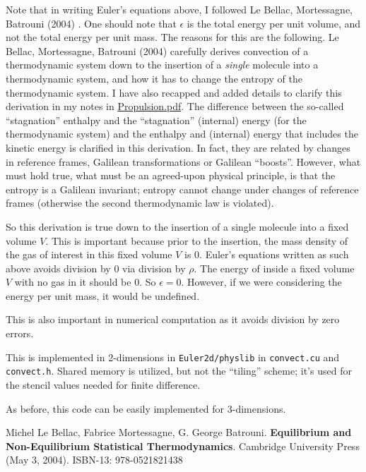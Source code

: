 \documentclass[10pt]{amsart}
\begin{document}
Note that in writing Euler's equations above, I followed Le Bellac, Mortessagne, Batrouni (2004) \cite{MLeBellacFMortessagneGBatrouni2004}.  One should note that $\epsilon$ is the total energy per unit volume, and not the total energy per unit mass.  The reasons for this are the following.  Le Bellac, Mortessagne, Batrouni (2004) \cite{MLeBellacFMortessagneGBatrouni2004} carefully derives convection of a thermodynamic system down to the insertion of a \emph{single} molecule into a thermodynamic system, and how it has to change the entropy of the thermodynamic system.  I have also recapped and added details to clarify this derivation in my notes in \href{https://github.com/ernestyalumni/Propulsion/blob/master/LaTeXandpdfs/Propulsion.pdf}{Propulsion.pdf}.  The difference between the so-called ``stagnation'' enthalpy and the ``stagnation'' (internal) energy (for the thermodynamic system) and the enthalpy and (internal) energy that includes the kinetic energy is clarified in this derivation.  In fact, they are related by changes in reference frames, Galilean transformations or Galilean ``boosts''.  However, what must hold true, what must be an agreed-upon physical principle, is that the entropy is a Galilean invariant; entropy cannot change under changes of reference frames (otherwise the second thermodynamic law is violated).

So this derivation is true down to the insertion of a single molecule into a fixed volume $V$.  This is important because prior to the insertion, the mass density of the gas of interest in this fixed volume $V$ is $0$.  Euler's equations written as such above avoids division by $0$ via division by $\rho$.  The energy of inside a fixed volume $V$ with no gas in it should be $0$.  So $\epsilon =0$.  However, if we were considering the energy per unit mass, it would be undefined.

This is also important in numerical computation as it avoids division by zero errors.

This is implemented in 2-dimensions in \verb|Euler2d/physlib| in \verb|convect.cu| and \verb|convect.h|.  Shared memory is utilized, but not the ``tiling'' scheme; it's used for the stencil values needed for finite difference.

As before, this code can be easily implemented for 3-dimensions.  


\begin{thebibliography}{9}
Michel Le Bellac, Fabrice Mortessagne, G. George Batrouni.  \textbf{Equilibrium and Non-Equilibrium Statistical Thermodynamics}.  Cambridge University Press (May 3, 2004).  ISBN-13: 978-0521821438

\end{thebibliography}
\end{document}
